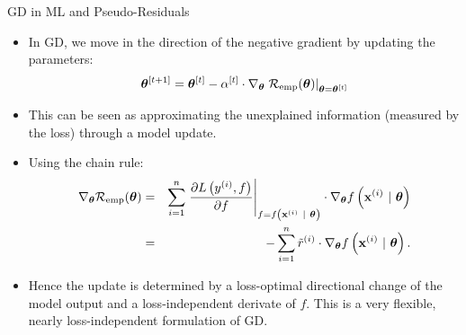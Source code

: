 \documentclass[11pt,compress,t,notes=noshow, xcolor=table]{beamer}
\begin{document}
\begin{vbframe}{GD in ML and Pseudo-Residuals}

\begin{itemize}
	\item In GD, we move in the direction of the negative gradient by updating the parameters: 
	$$
	 \bm{\theta}^{[t + 1]} = \bm{\theta}^{[t]} - \alpha^{[t]} \cdot \nabla_{\bm{\theta}} \left.\mathcal{R}_{\text{emp}}(\bm{\theta})\right|_{\bm{\theta} = \bm{\theta}^{[t]}}	
	$$
	\item This can be seen as approximating the unexplained information (measured by the loss) through a model update. 
	\item Using the chain rule:
	\begin{eqnarray*}
	\nabla_{\bm{\theta}} \mathcal{R}_{\text{emp}}(\bm{\theta}) &=&\sum\limits_{i=1}^n \left.\frac{\partial L\left(y^{(i)}, f\right)}{\partial f} \right|_{f = f\left(\mathbf{x}^{(i)} ~|~ \bm{\theta}\right)} 
	\cdot \nabla_{\bm{\theta}} f\left(\mathbf{x}^{(i)} ~|~ \bm{\theta}\right) \\ 
	&=& - \sum\limits_{i=1}^n \tilde r^{(i)} \cdot \nabla_{\bm{\theta}} f\left(\mathbf{x}^{(i)} ~|~ \bm{\theta}\right).
	\end{eqnarray*}
	\item Hence the update is determined by a loss-optimal directional change of the model output 
        and a loss-independent derivate of $f$.
        This is a very flexible, nearly loss-independent formulation of GD.
\end{itemize}	

\end{vbframe}
\end{document}
